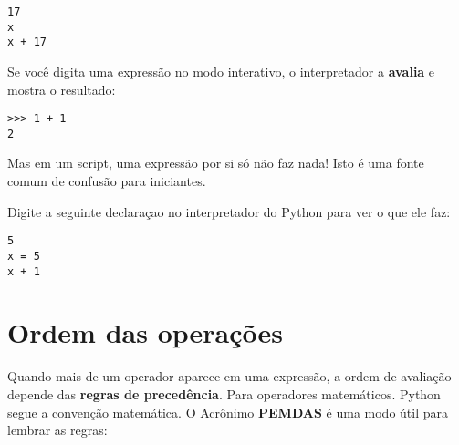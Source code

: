 {{{{{{{{{{{{{

\beforeverb
\begin{verbatim}
17
x
x + 17
\end{verbatim}
\afterverb
%

Se você digita uma expressão no modo interativo, o interpretador
a {\bf avalia} e mostra o resultado:

\beforeverb
\begin{verbatim}
>>> 1 + 1
2
\end{verbatim}
\afterverb
%

Mas em um script, uma expressão por si só não 
faz nada! Isto é uma fonte comum 
de confusão para iniciantes.

%                                                                                                       
\begin{ex}
Digite a seguinte declaraçao no interpretador do Python para ver 
o que ele faz:
\beforeverb
\begin{verbatim}
5
x = 5
x + 1
\end{verbatim}
\afterverb
%
\end{ex}


\section{Ordem das operações}


Quando mais de um operador aparece em uma expressão, a ordem de 
avaliação depende das {\bf regras de precedência}. Para 
operadores matemáticos. Python segue a convenção matemática.
O Acrônimo {\bf PEMDAS} é uma modo útil para lembrar as regras:

}}}}}}}}}}}}}
